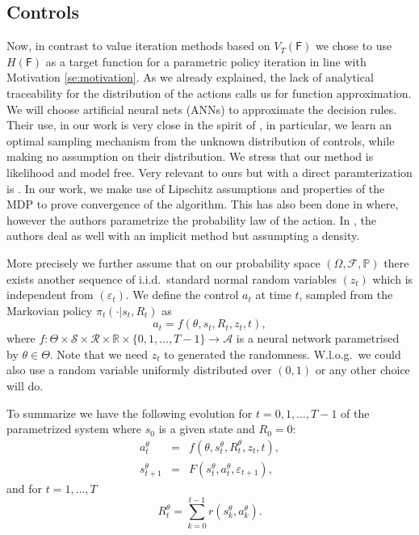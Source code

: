 \documentclass[reqno, 11pt]{amsart}%
\theoremstyle{definition}
\begin{document}
\subsection{Controls}
Now, in contrast to value iteration methods based on $V_T(\mathsf F)$ we chose to use $H(\mathsf F)$ as a target function for a parametric policy iteration in line with Motivation \ref{se:motivation}. As we already explained, the lack of analytical traceability for the distribution of the actions calls us for function approximation. 
We will choose artificial neural nets (ANNs) to approximate the decision rules. Their use, in our work is very close in the spirit of \cite{Goodfellow2014GAN}, in particular, we learn an optimal sampling mechanism from the unknown distribution of controls, while making no assumption on their distribution. We stress that our method is likelihood and model free. Very relevant to ours but with a direct paramterization is \cite{han2016deep,hure2021deep}. In our work, we make use of Lipschitz assumptions and properties of the MDP to prove convergence of the algorithm. This has also been done in \cite{pirotta2015policy} where, however the authors parametrize the probability law of the action. In \cite{fatkhullin2023stochasticpolicygradientmethods}, the authors deal as well with an implicit method but assumpting a density.

More precisely  we further assume that on our  probability space $(\Omega, \mathcal{F},\mathbb{P})$ there exists another  sequence of i.i.d.\  standard normal random variables $(z_t)$ which is independent from $(\varepsilon_t)$.
We define the control $a_t$ at time $t$, sampled from the Markovian policy $\pi_t(\cdot|s_t,R_t)$  as 
\begin{equation}
    a_t = f(\theta,s_t,R_t,z_t,t), %
\end{equation}
where $f: \Theta\times \mathcal{S}\times \mathcal R \times \mathbb{R} \times \{0,1,\ldots,T-1\}\to \mathcal{A}$ is a neural network parametrised by $\theta\in\Theta$. Note that we need $z_t$ to generated the randomness. W.l.o.g.\ we could also use a random variable uniformly distributed over $(0,1)$ or any other choice will do. 

To summarize we have the following evolution for $t=0,1,\ldots ,T-1$ of the parametrized system where $s_0$ is a given state and $R_0=0$:
\begin{eqnarray*}
a_t^\theta &=& f(\theta,s_t^\theta,R_t^\theta,z_t,t),\\
s_{t+1}^\theta &=& F(s_t^\theta,a_t^\theta, \varepsilon_{t+1}),
\end{eqnarray*}
and for $t=1,\ldots ,T$
$$R_t^\theta = \sum_{k=0}^{t-1} r(s_k^\theta,a_k^\theta).$$ 
\end{document}
